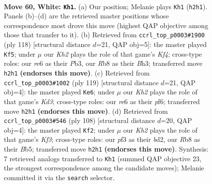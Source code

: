 \documentclass[11pt]{article}
\begin{document}
\clearpage

\begin{figure}[p]\centering
\begin{subfigure}{0.46\textwidth}\centering
\resizebox{\linewidth}{!}{%
\newchessgame
\chessboard[
  setfen={1R6/7k/4r3/8/B3p2p/4Bp1P/b4P1K/8 w - - 30 60},
  showmover=false,
  pgfstyle=straightmove, color=movearrow, markmove={h2-h1}
]}
\caption{}
\end{subfigure}\hfill
\begin{subfigure}{0.46\textwidth}\centering
\resizebox{\linewidth}{!}{%
\newchessgame
\chessboard[
  setfen={3k4/5p2/1p6/p1b1P3/P4K1p/1P5B/8/8 w - - 36 60},
  showmover=false,
  pgfstyle=straightmove, color=movearrow, markmove={f4-f5}
]}
\caption{}
\end{subfigure}
\\[4pt]
\begin{subfigure}{0.46\textwidth}\centering
\resizebox{\linewidth}{!}{%
\newchessgame
\chessboard[
  setfen={7B/7p/3k1P1P/8/p7/Pb1K4/1P6/8 b - - 18 60},
  showmover=false,
  pgfstyle=straightmove, color=movearrow, markmove={d6-e6}
]}
\caption{}
\end{subfigure}\hfill
\begin{subfigure}{0.46\textwidth}\centering
\resizebox{\linewidth}{!}{%
\newchessgame
\chessboard[
  setfen={2b5/1p3k2/1P1p4/1B1P1p2/3B4/5KP1/3b4/8 w - - 16 55},
  showmover=false,
  pgfstyle=straightmove, color=movearrow, markmove={f3-f2}
]}
\caption{}
\end{subfigure}
\caption{\textbf{Move 60, White: \texttt{Kh1}.} (a) Our position; Melanie plays \texttt{Kh1} (\texttt{h2h1}). Panels (b)--(d) are the retrieved master positions whose correspondence most drove this move (highest QAP objective among those that transfer to it). (b) Retrieved from \texttt{ccrl\_top\_p0003\#1900} (ply 118) [structural distance $d$=21, QAP obj=5]: the master played \texttt{Kf5}; under $\mu$ our \emph{Kh2} plays the role of that game's \emph{Kf4}; cross-type roles: our \emph{r}e6 as their \emph{P}b3, our \emph{R}b8 as their \emph{B}h3; transferred move \texttt{h2h1} \textbf{(endorses this move)}. (c) Retrieved from \texttt{ccrl\_top\_p0003\#1002} (ply 119) [structural distance $d$=21, QAP obj=4]: the master played \texttt{Ke6}; under $\mu$ our \emph{Kh2} plays the role of that game's \emph{Kd3}; cross-type roles: our \emph{r}e6 as their \emph{p}f6; transferred move \texttt{h2h1} \textbf{(endorses this move)}. (d) Retrieved from \texttt{ccrl\_top\_p0003\#546} (ply 108) [structural distance $d$=20, QAP obj=4]: the master played \texttt{Kf2}; under $\mu$ our \emph{Kh2} plays the role of that game's \emph{Kf3}; cross-type roles: our \emph{p}f3 as their \emph{b}d2, our \emph{R}b8 as their \emph{B}b5; transferred move \texttt{h2h1} \textbf{(endorses this move)}. Synthesis: 7 retrieved analogs transferred to \texttt{Kh1} (summed QAP objective 23, the strongest correspondence among the candidate moves); Melanie committed it via the \texttt{search} selector.}
\label{fig:thought-m118}
\end{figure}
\end{document}
